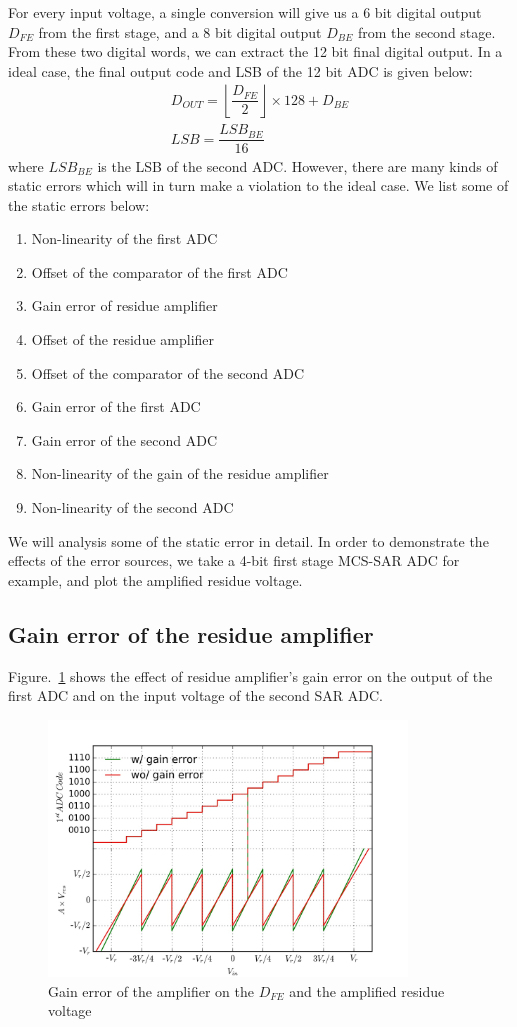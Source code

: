 \documentclass[12pt,a4paper]{article}
\begin{document}
For every input voltage, a single conversion will give us a 6 bit digital output $D_{FE}$ from the first stage, and a 8 bit digital output $D_{BE}$ from the second stage. From these two digital words, we can extract the 12 bit final digital output. In a ideal case, the final output code and LSB of the 12 bit ADC is given below:
\begin{gather}
	D_{OUT} = \left\lfloor \dfrac{D_{FE}}{2} \right\rfloor \times 128  + D_{BE} \\
	LSB = \dfrac{LSB_{BE}}{16}
\end{gather}
where $LSB_{BE}$ is the LSB of the second ADC. However, there are many kinds of static errors which will in turn make a violation to the ideal case. We list some of the static errors below:
\begin{enumerate}
	\item Non-linearity of the first ADC
	\item Offset of the comparator of the first ADC
	\item Gain error of residue amplifier
	\item Offset of the residue amplifier
	\item Offset of the comparator of the second ADC
	\item Gain error of the first ADC
	\item Gain error of the second ADC
	\item Non-linearity of the gain of the residue amplifier
	\item Non-linearity of the second ADC
\end{enumerate}

We will analysis some of the static error in detail. In order to demonstrate the effects of the error sources, we take a 4-bit first stage MCS-SAR ADC for example, and plot the amplified residue voltage.

\subsection{Gain error of the residue amplifier}
Figure.~\ref{fig:gain_error} shows the effect of residue amplifier's gain error on the output of the first ADC and on the input voltage of the second SAR ADC.
\begin{figure}[!h]
	\centering
	\includegraphics[width=0.85\textwidth]{figures/gain_error.jpg}
	\caption{Gain error of the amplifier on the $D_{FE}$ and the amplified residue voltage}
	\label{fig:gain_error}
\end{figure}
\end{document}
